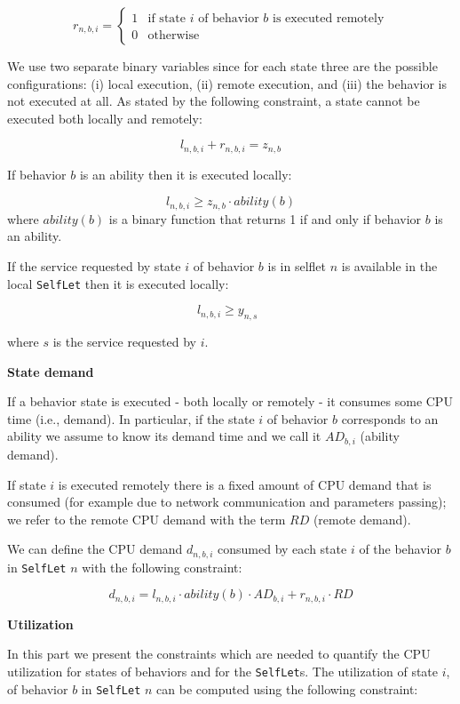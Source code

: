\documentclass[11pt]{amsart}
\newcommand{\slet}{\texttt{SelfLet}}
\newcommand{\moreslet}{\texttt{SelfLet}s}
\begin{document}
 
$$
r_{n, b, i} = \left\{ 
	\begin{array}{rl}
	1 & \mbox{if state $i$ of behavior $b$ is executed remotely} \\
	0 & \mbox{otherwise} 
	\end{array} \right.
$$

We use two separate binary variables since for each state three are the possible configurations: (i) local execution, (ii) remote execution, and (iii) the behavior is not executed at all. As stated by the following constraint, a state cannot be executed both locally and remotely:

$$
	l_{n, b, i} + r_{n, b, i} = z_{n,b} 
$$

If behavior $b$ is an ability then it is executed locally:

$$
	l_{n, b, i} \geq z_{n,b} \cdot ability(b) 
$$
where $ability(b)$ is a binary function that returns 1 if and only if behavior $b$ is an ability.

If the service requested by state $i$ of behavior $b$ is in selflet $n$ is available in the local \slet{} then it is executed locally:

$$
	l_{n, b, i} \geq y_{n,s} \; \; 
$$

where $s$ is the service requested by $i$.



{\bf State demand}

If a behavior state is executed - both locally or remotely - it consumes some CPU time (i.e., demand). In particular, if the state $i$ of behavior $b$ corresponds to an ability we assume to know its demand time and we call it $AD_{b,i}$ (ability demand). 

If state $i$ is executed remotely there is a fixed amount of CPU demand that is consumed (for example due to network communication and parameters passing); we refer to the remote CPU demand with the term $RD$ (remote demand).


We can define the CPU demand $d_{n, b, i}$ consumed by each state $i$ of the behavior $b$ in \slet{} $n$ with the following constraint:

$$
	d_{n, b, i} = l_{n, b, i} \cdot ability(b) \cdot AD_{b,i} + r_{n, b, i} \cdot RD
$$


{\bf Utilization}

In this part we present the constraints which are needed to quantify the CPU utilization for states of behaviors and for the \moreslet{}.
The utilization of state $i$, of behavior $b$ in \slet{} $n$ can be computed using the following constraint:
\end{document}

